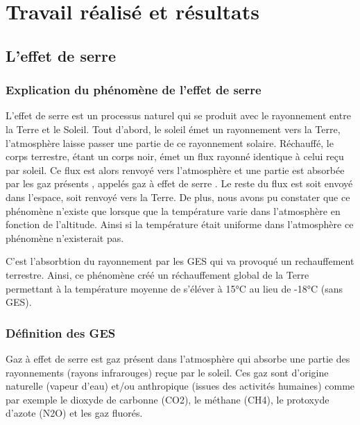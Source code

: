 \documentclass[a4paper, 12pt]{report} %
\begin{document}

\chapter{Travail réalisé et résultats}

\section{L'effet de serre}

\subsection{Explication du phénomène de l'effet de serre}

L’effet de serre est un processus naturel qui se produit avec le rayonnement 
entre la Terre et le Soleil. Tout d'abord, le soleil émet un rayonnement vers la Terre, 
l'atmosphère laisse passer une partie de ce rayonnement solaire. Réchauffé, le corps terrestre, 
étant un corps noir, émet un flux rayonné identique à celui reçu par soleil. Ce flux est 
alors renvoyé vers l'atmosphère et une partie est absorbée par les gaz présents , appelés 
gaz à effet de serre . Le reste du flux est soit envoyé dans l'espace, soit renvoyé vers la Terre. 
De plus, nous avons pu constater que ce phénomène n'existe que lorsque que la température varie 
dans l'atmosphère en fonction de l'altitude. Ainsi si la température était uniforme dans 
l'atmosphère ce phénomène n'existerait pas. 



C'est l'absorbtion du rayonnement par les GES qui va provoqué un rechauffement terrestre. 
Ainsi, ce phénomène créé un réchauffement global de la Terre permettant à la température 
moyenne de s'éléver à 15°C au lieu de -18°C (sans GES).  

\subsection{Définition des GES}
Gaz à effet de serre est gaz présent dans l’atmosphère qui absorbe une partie des rayonnements (rayons infrarouges) reçue par le soleil. Ces gaz sont d’origine naturelle (vapeur d’eau) et/ou anthropique (issues des activités humaines) comme par exemple le dioxyde de carbonne (CO2), le méthane (CH4), le protoxyde d'azote (N2O) et les gaz fluorés. 
 \vspace{\baselineskip}
\end{document}
